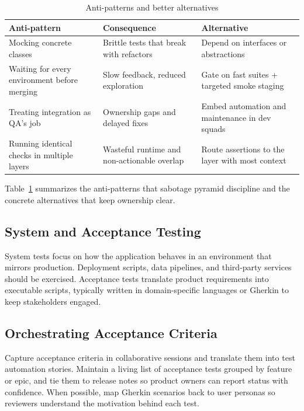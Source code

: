 \begin{table}[h]
\centering
\caption{Anti-patterns and better alternatives}
\label{tab:anti-patterns}
\begin{tabular}{p{4cm}p{4cm}p{4cm}}
\toprule
Anti-pattern & Consequence & Alternative \\
\midrule
Mocking concrete classes & Brittle tests that break with refactors & Depend on interfaces or abstractions \\
Waiting for every environment before merging & Slow feedback, reduced exploration & Gate on fast suites + targeted smoke staging \\
Treating integration as QA’s job & Ownership gaps and delayed fixes & Embed automation and maintenance in dev squads \\
Running identical checks in multiple layers & Wasteful runtime and non-actionable overlap & Route assertions to the layer with most context \\
\bottomrule
\end{tabular}
\end{table}

Table~\ref{tab:anti-patterns} summarizes the anti-patterns that sabotage pyramid discipline and the concrete alternatives that keep ownership clear.

\subsection{System and Acceptance Testing}

System tests focus on how the application behaves in an environment that mirrors production. Deployment scripts, data pipelines, and third-party services should be exercised. Acceptance tests translate product requirements into executable scripts, typically written in domain-specific languages or Gherkin to keep stakeholders engaged.

\subsection{Orchestrating Acceptance Criteria}

Capture acceptance criteria in collaborative sessions and translate them into test automation stories. Maintain a living list of acceptance tests grouped by feature or epic, and tie them to release notes so product owners can report status with confidence. When possible, map Gherkin scenarios back to user personas so reviewers understand the motivation behind each test.

